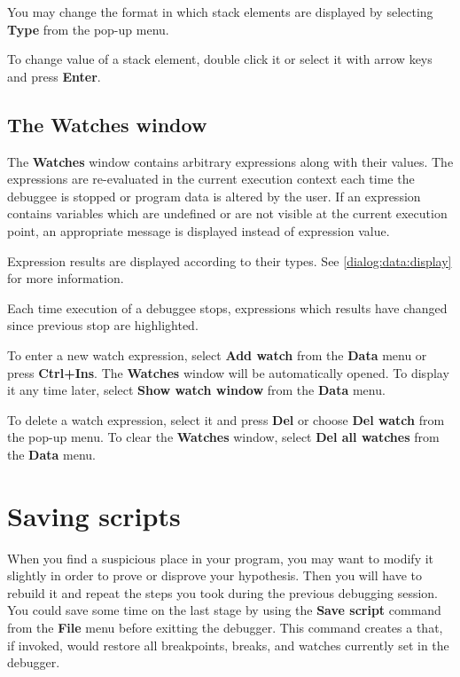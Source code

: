 You may change the format in which stack elements are displayed by
selecting {\bf Type} from the pop-up menu.

To change value of a stack element, double click it or select it with arrow keys
and press {\bf Enter}.

\subsection{The Watches window}
\label{dialog:data:watches}

The {\bf Watches} window contains arbitrary expressions along with their values.
The expressions are re-evaluated in the current execution context each time
the debuggee is stopped or program data is altered by the user.
If an expression contains variables which are undefined or are not visible
at the current execution point, an appropriate message is displayed instead
of expression value.

Expression results are displayed according to their types.
See \ref{dialog:data:display} for more information.

Each time execution of a debuggee stops, expressions which results have
changed since previous stop are highlighted.

To enter a new watch expression, select {\bf Add watch} from the {\bf Data}
menu or press {\bf Ctrl+Ins}. The {\bf Watches} window will be automatically
opened. To display it any time later, select {\bf Show watch window} from
the {\bf Data} menu.

To delete a watch expression, select it and press {\bf Del} or choose
{\bf Del watch} from the pop-up menu. To clear the {\bf Watches} window,
select {\bf Del all watches} from the {\bf Data} menu.

\section{Saving scripts}
\label{dialog:scripts}


When you find a suspicious place in your program, you may want to modify it
slightly in order to prove or disprove your hypothesis. Then you will have to
rebuild it and repeat the steps you took during the previous debugging
session. You could save some time on the last stage by using the {\bf Save script}
command from the {\bf File} menu before exitting the debugger. This command
creates a  that, if invoked, would restore
all breakpoints, breaks, and watches currently set in the debugger.

